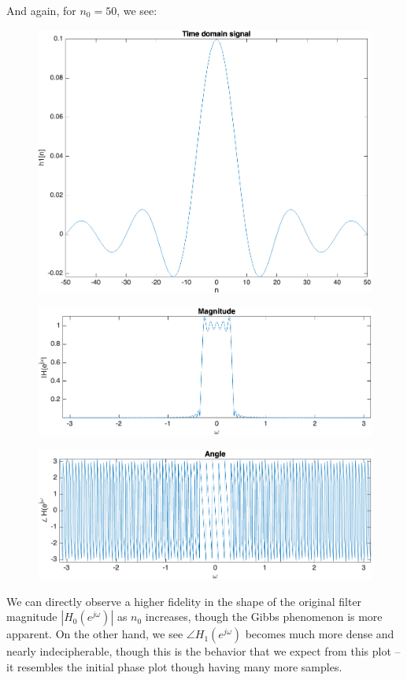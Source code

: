 \documentclass[12pt]{article}
\begin{document}
\begin{enumerate}[label=\textbf{\alph*)}, leftmargin=2.6em]
\begin{figure} [H]
\end{figure}
And again, for $n_0=50$, we see:
\begin{figure} [H]
    \centering
    \includegraphics[width=0.75\linewidth]{7.png}
\end{figure}
\begin{figure} [H]
    \centering
    \includegraphics[width=0.75\linewidth]{8.png}
\end{figure}
\begin{figure} [H]
    \centering
    \includegraphics[width=0.75\linewidth]{9.png}
\end{figure}
We can directly observe a higher fidelity in the shape of the original filter magnitude $|H_0(e^{j\omega})|$ as $n_0$ increases, though the Gibbs phenomenon is more apparent. On the other hand, we see $\angle H_1(e^{j\omega})$ becomes much more dense and nearly indecipherable, though this is the behavior that we expect from this plot \--- it resembles the initial phase plot though having many more samples.


\end{enumerate}
\end{document}
